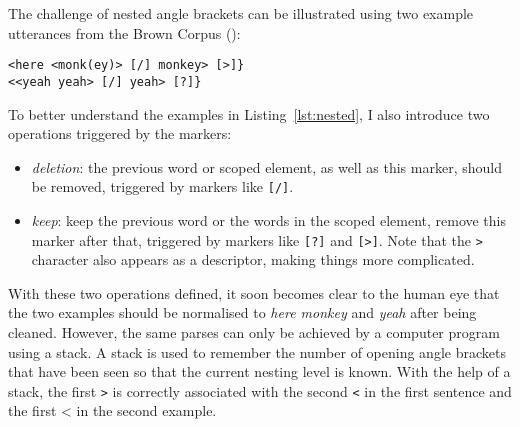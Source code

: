 The challenge of nested angle brackets can be illustrated using two example utterances from the Brown Corpus (\cite{brown1973}):\\
\vspace{-1em}
\lstset{
numbers = none,
frame = single,
}

\begin{lstlisting}[caption={Example utterances with nested angle brackets}, label={lst:nested}]
<here <monk(ey)> [/] monkey> [>]}
<<yeah yeah> [/] yeah> [?]}
\end{lstlisting}


To better understand the examples in Listing~\ref{lst:nested}, I also introduce two operations triggered by the markers:
\begin{itemize}
	\item \emph{deletion}: the previous word or scoped element, as well as this marker, should be removed, triggered by markers like \texttt{[/]}.
	\item \emph{keep}: keep the previous word or the words in the scoped element, remove this marker after that, triggered by markers like \texttt{[?]} and \texttt{[>]}. Note that the \texttt{>} character also appears as a descriptor, making things more complicated.
\end{itemize}

With these two operations defined, it soon becomes clear to the human eye that the two examples should be normalised to \emph{here monkey} and \emph{yeah} after being cleaned. However, the same parses can only be achieved by a computer program using a stack. A stack is used to remember the number of opening angle brackets that have been seen so that the current nesting level is known. With the help of a stack, the first \texttt{>} is correctly associated with the second \texttt{<} in the first sentence and the first {<} in the second example.




